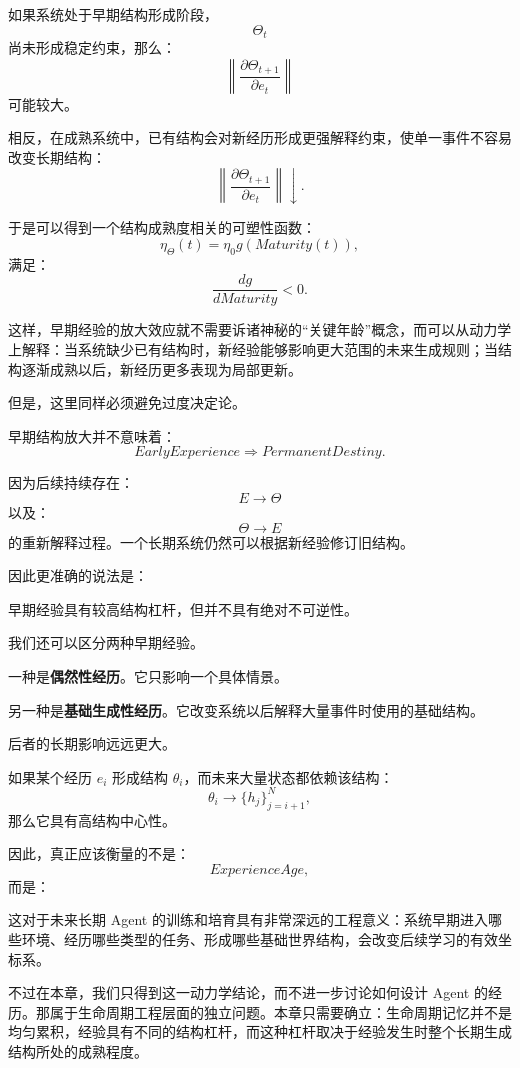如果系统处于早期结构形成阶段，
\[
\Theta_t
\]
尚未形成稳定约束，那么：
\[
\left\|
\frac{\partial \Theta_{t+1}}
{\partial e_t}
\right\|
\]
可能较大。

相反，在成熟系统中，已有结构会对新经历形成更强解释约束，使单一事件不容易改变长期结构：
\[
\left\|
\frac{\partial \Theta_{t+1}}
{\partial e_t}
\right\|
\downarrow.
\]

于是可以得到一个结构成熟度相关的可塑性函数：
\[
\eta_\Theta(t)
=
\eta_0
g(Maturity(t)),
\]
满足：
\[
\frac{dg}{dMaturity}<0.
\]

这样，早期经验的放大效应就不需要诉诸神秘的“关键年龄”概念，而可以从动力学上解释：当系统缺少已有结构时，新经验能够影响更大范围的未来生成规则；当结构逐渐成熟以后，新经历更多表现为局部更新。

但是，这里同样必须避免过度决定论。

早期结构放大并不意味着：
\[
EarlyExperience
\Rightarrow
PermanentDestiny.
\]

因为后续持续存在：
\[
E\rightarrow\Theta
\]
以及：
\[
\Theta\rightarrow E
\]
的重新解释过程。一个长期系统仍然可以根据新经验修订旧结构。

因此更准确的说法是：
\begin{statementbox}
早期经验具有较高结构杠杆，但并不具有绝对不可逆性。
\end{statementbox}

我们还可以区分两种早期经验。

一种是\textbf{偶然性经历}。它只影响一个具体情景。

另一种是\textbf{基础生成性经历}。它改变系统以后解释大量事件时使用的基础结构。

后者的长期影响远远更大。

如果某个经历 \(e_i\) 形成结构 \(\theta_i\)，而未来大量状态都依赖该结构：
\[
\theta_i
\rightarrow
\{h_j\}_{j=i+1}^{N},
\]
那么它具有高结构中心性。

因此，真正应该衡量的不是：
\[
ExperienceAge,
\]
而是：
\begin{statementbox}
\centering
{}
\end{statementbox}

这对于未来长期 Agent 的训练和培育具有非常深远的工程意义：系统早期进入哪些环境、经历哪些类型的任务、形成哪些基础世界结构，会改变后续学习的有效坐标系。

不过在本章，我们只得到这一动力学结论，而不进一步讨论如何设计 Agent 的经历。那属于生命周期工程层面的独立问题。本章只需要确立：生命周期记忆并不是均匀累积，经验具有不同的结构杠杆，而这种杠杆取决于经验发生时整个长期生成结构所处的成熟程度。

